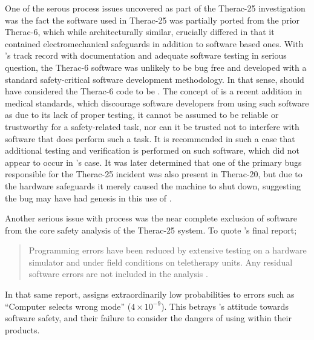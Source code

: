 \documentclass{cshonours}
\newcommand{\ther}{Therac-25\xspace}
\begin{document}
One of the serous process issues uncovered as part of the \ther investigation was the fact the software used in \ther was partially ported from the prior Therac-6, which while architecturally similar, crucially differed in that it contained electromechanical safeguards in addition to software based ones. With \aecl's track record with documentation and adequate software testing in serious question, the Therac-6 software was unlikely to be bug free and developed with a standard safety-critical software development methodology. In that sense, \aecl should have considered the Therac-6 code to be \soup. The concept of \soup is a recent addition in medical standards, which discourage software developers from using such software as due to its lack of proper testing, it cannot be assumed to be reliable or trustworthy for a safety-related task, nor can it be trusted not to interfere with software that does perform such a task. It is recommended in such a case that additional testing and verification is performed on such software, which did not appear to occur in \aecl's case. It was later determined that one of the primary bugs responsible for the \ther incident was also present in Therac-20, but due to the hardware safeguards it merely caused the machine to shut down, suggesting the bug may have had genesis in this use of \soup.

Another serious issue with process was the near complete exclusion of software from the core safety analysis of the \ther system. To quote \aecl's final report; 
\begin{quote}
Programming errors have been reduced by extensive testing on a hardware simulator and under field conditions on teletherapy units. Any residual software errors are not included in the analysis \cite[p.~4]{leveson1993investigation}.
\end{quote}
In that same report, \aecl assigns extraordinarily low probabilities to errors such as ``Computer selects wrong mode'' ($4 \times 10^{-9}$). This betrays \aecl's attitude towards software safety, and their failure to consider the dangers of using \soup within their products. 
\end{document}
